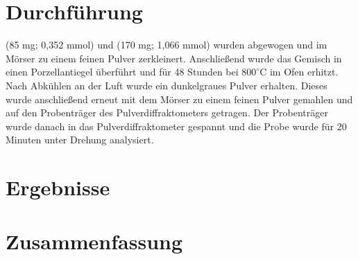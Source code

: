 \documentclass[a4paper,12pt,bibliography=totocnumbered]{scrartcl}
\begin{document}
\section{Durchführung}
(85 mg; 0,352 mmol) und (170 mg; 1,066 mmol) wurden abgewogen und im Mörser zu einem feinen Pulver zerkleinert. 
Anschließend wurde das Gemisch in einen Porzellantiegel überführt und für 48 Stunden bei $800 ^\circ$C im Ofen erhitzt.\\
Nach Abkühlen an der Luft wurde ein dunkelgraues Pulver erhalten. 
Dieses wurde anschließend erneut mit dem Mörser zu einem feinen Pulver gemahlen und auf den Probenträger des Pulverdiffraktometers getragen. 
Der Probenträger wurde danach in das Pulverdiffraktometer gespannt und die Probe wurde für 20 Minuten unter Drehung analysiert.

\section{Ergebnisse}





\cite{FeDiff}



\section{Zusammenfassung}



\printbibliography[title={Literatur}]
\end{document}
